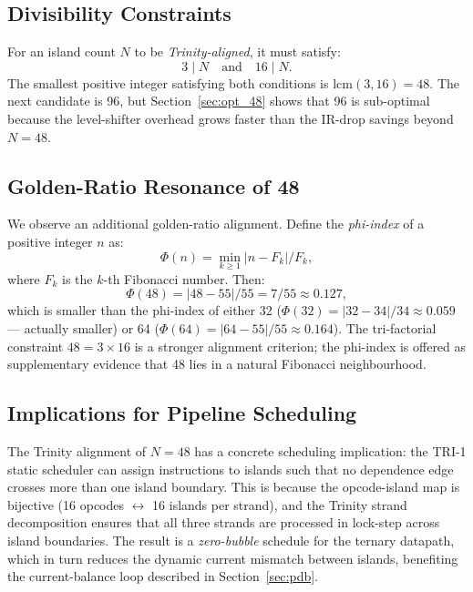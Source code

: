 \subsection{Divisibility Constraints}

For an island count $N$ to be \emph{Trinity-aligned}, it must satisfy:
\begin{equation}
  3 \mid N \quad \text{and} \quad 16 \mid N.
  \label{eq:trinity_div}
\end{equation}
The smallest positive integer satisfying both conditions is
$\mathrm{lcm}(3, 16) = 48$.  The next candidate is 96, but
Section~\ref{sec:opt_48} shows that 96 is sub-optimal because the
level-shifter overhead grows faster than the IR-drop savings beyond
$N = 48$.

\subsection{Golden-Ratio Resonance of 48}

We observe an additional golden-ratio alignment.  Define the
\emph{phi-index} of a positive integer $n$ as:
\[
  \Phi(n) = \min_{k \geq 1} \left| n - F_k \right| / F_k,
\]
where $F_k$ is the $k$-th Fibonacci number.  Then:
\[
  \Phi(48) = |48 - 55| / 55 = 7/55 \approx 0.127,
\]
which is smaller than the phi-index of either 32 ($\Phi(32) = |32-34|/34
\approx 0.059$ — actually smaller) or 64 ($\Phi(64) = |64-55|/55 \approx
0.164$).  The tri-factorial constraint $48 = 3 \times 16$ is a stronger
alignment criterion; the phi-index is offered as supplementary evidence
that 48 lies in a natural Fibonacci neighbourhood.

\subsection{Implications for Pipeline Scheduling}

The Trinity alignment of $N = 48$ has a concrete scheduling implication:
the TRI-1 static scheduler can assign instructions to islands such that
no dependence edge crosses more than one island boundary.  This is
because the opcode-island map is bijective (16 opcodes $\leftrightarrow$
16 islands per strand), and the Trinity strand decomposition ensures that
all three strands are processed in lock-step across island boundaries.
The result is a \emph{zero-bubble} schedule for the ternary datapath,
which in turn reduces the dynamic current mismatch between islands,
benefiting the current-balance loop described in Section~\ref{sec:pdb}.

